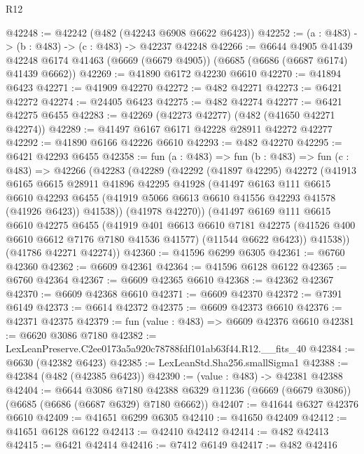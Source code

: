 \begin{lexlean}{R12}
\begin{coremodule}
@42248 := @42242 (@482 (@42243 @6908 @6622 @6423))
@42252 := (a : @483) -> (b : @483) -> (c : @483) -> @42237 @42248
@42266 := @6644
    @4905
    @41439
    @42248
    @6174
    @41463
    (@6669 (@6679 @4905))
    (@6685 (@6686 (@6687 @6174) @41439 @6662))
@42269 := @41890 @6172 @42230 @6610
@42270 := @41894 @6423
@42271 := @41909 @42270
@42272 := @482 @42271
@42273 := @6421 @42272
@42274 := @24405 @6423
@42275 := @482 @42274
@42277 := @6421 @42275 @6455
@42283 := @42269 (@42273 @42277) (@482 (@41650 @42271 @42274))
@42289 := @41497 @6167 @6171 @42228 @28911 @42272 @42277
@42292 := @41890 @6166 @42226 @6610
@42293 := @482 @42270
@42295 := @6421 @42293 @6455
@42358 := fun (a : @483) =>
  fun (b : @483) =>
  fun (c : @483) =>
  @42266
    (@42283
      (@42289
        (@42292
          (@41897 @42295)
          @42272
          (@41913
            @6165
            @6615
            @28911
            @41896
            @42295
            @41928
            (@41497
              @6163
              @111
              @6615
              @6610
              @42293
              @6455
              (@41919 @5066 @6613 @6610 @41556 @42293 @41578 (@41926 @6423))
              @41538))
          (@41978 @42270))
        (@41497
          @6169
          @111
          @6615
          @6610
          @42275
          @6455
          (@41919
            @401
            @6613
            @6610
            @7181
            @42275
            (@41526 @400 @6610 @6612 @7176 @7180 @41536 @41577)
            (@11544 @6622 @6423))
          @41538))
      (@41786 @42271 @42274))
@42360 := @41596 @6299 @6305
@42361 := @6760 @42360
@42362 := @6609 @42361
@42364 := @41596 @6128 @6122
@42365 := @6760 @42364
@42367 := @6609 @42365 @6610
@42368 := @42362 @42367
@42370 := @6609 @42368 @6610
@42371 := @6609 @42370
@42372 := @7391 @6149
@42373 := @6614 @42372
@42375 := @6609 @42373 @6610
@42376 := @42371 @42375
@42379 := fun (value : @483) => @6609 @42376 @6610
@42381 := @6620 @3086 @7180
@42382 := LexLeanPreserve.C2ee0173a5a920c78788fdf101ab63f44.R12.__fits_40
@42384 := @6630 (@42382 @6423)
@42385 := LexLeanStd.Sha256.smallSigma1
@42388 := @42384 (@482 (@42385 @6423))
@42390 := (value : @483) -> @42381 @42388
@42404 := @6644
    @3086
    @7180
    @42388
    @6329
    @11236
    (@6669 (@6679 @3086))
    (@6685 (@6686 (@6687 @6329) @7180 @6662))
@42407 := @41644 @6327 @42376 @6610
@42409 := @41651 @6299 @6305
@42410 := @41650 @42409
@42412 := @41651 @6128 @6122
@42413 := @42410 @42412
@42414 := @482 @42413
@42415 := @6421 @42414
@42416 := @7412 @6149
@42417 := @482 @42416

\end{coremodule}
\end{lexlean}
